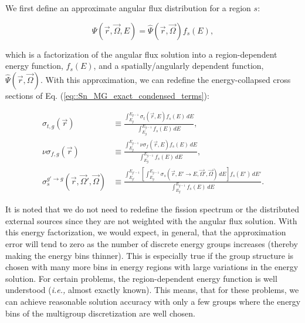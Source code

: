 We first define an approximate angular flux distribution for a region $s$:

\begin{equation}
\label{eq::Sn_MG_flux_approx}
\Psi (\vec{r},\vec{\Omega}, E) =  \hat{\Psi} (\vec{r},\vec{\Omega}) f_{s} (E) ,
\end{equation}

\noindent which is a factorization of the angular flux solution into a region-dependent energy function, $f_s (E)$, and a spatially/angularly dependent function, $\hat{\Psi} (\vec{r},\vec{\Omega})$. With this approximation, we can redefine the energy-collapsed cross sections of Eq. (\ref{eq::Sn_MG_exact_condensed_terms}):

\begin{equation}
\label{eq::MG_approx_condensed_terms}
\begin{aligned}
\sigma_{t,g} (\vec{r}) & \equiv \frac{\int_{E_{g}}^{E_{g-1}} \sigma_{t} (\vec{r},E) f_{s} (E) \, dE}{\int_{E_{g}}^{E_{g-1}} f_{s} (E) \, dE} ,\\
\nu\sigma_{f,g} (\vec{r}) & \equiv \frac{\int_{E_{g}}^{E_{g-1}} \nu\sigma_{f} (\vec{r},E)  f_{s} (E) \, dE }{\int_{E_{g}}^{E_{g-1}} f_{s} (E) \, dE}, \\
\sigma_{s}^{g' \rightarrow g} (\vec{r},\vec{\Omega}' , \vec{\Omega} ) & \equiv \frac{\int_{E_{g'}}^{E_{g'-1}} \left[ \int_{E_{g}}^{E_{g-1}} \sigma_s (\vec{r},E' \rightarrow E,\vec{\Omega}' , \vec{\Omega} ) \, dE \right] f_{s} (E')\, dE' }{\int_{E_{g}}^{E_{g-1}}  f_{s} (E) \, dE} .
\end{aligned}
\end{equation}

\noindent It is noted that we do not need to redefine the fission spectrum or the distributed external sources since they are not weighted with the angular flux solution. With this energy factorization, we would expect, in general, that the approximation error will tend to zero as the number of discrete energy groups increases (thereby making the energy bins thinner). This is especially true if the group structure is chosen with many more bins in energy regions with large variations in the energy solution. For certain problems, the region-dependent energy function is well understood ({\em i.e.,} almost exactly known). This means, that for these problems, we can achieve reasonable solution accuracy with only a few groups where the energy bins of the multigroup discretization are well chosen.


